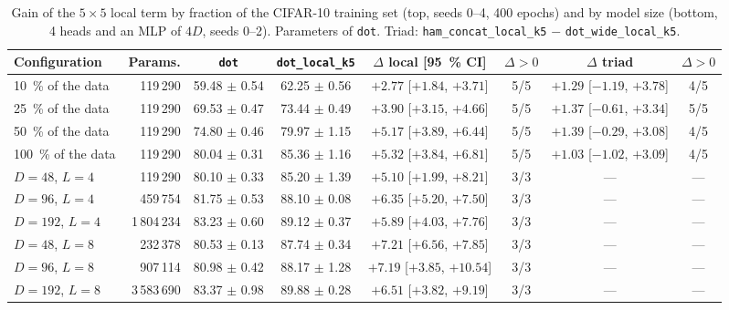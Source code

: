 
\begin{table}[!t]
\centering
\small
\caption{Gain of the $5\times5$ local term by fraction of the CIFAR-10 training set (top, seeds 0--4, 400 epochs) and by model size (bottom, 4 heads and an MLP of $4D$, seeds 0--2). Parameters of \texttt{dot}. Triad: \texttt{ham\_concat\_local\_k5} $-$ \texttt{dot\_wide\_local\_k5}.}
\label{tab:escala}
\begin{adjustbox}{max width=\linewidth}
\begin{tabular}{lrcccccc}
\toprule
Configuration & Params. & \texttt{dot} & \texttt{dot\_local\_k5} & $\Delta$ local [95~\% CI] & $\Delta>0$ & $\Delta$ triad & $\Delta>0$ \\
\midrule
10~\% of the data & 119\,290 & 59.48 $\pm$ 0.54 & 62.25 $\pm$ 0.56 & $+2.77$ [$+1.84$, $+3.71$] & 5/5 & $+1.29$ [$-1.19$, $+3.78$] & 4/5 \\
25~\% of the data & 119\,290 & 69.53 $\pm$ 0.47 & 73.44 $\pm$ 0.49 & $+3.90$ [$+3.15$, $+4.66$] & 5/5 & $+1.37$ [$-0.61$, $+3.34$] & 5/5 \\
50~\% of the data & 119\,290 & 74.80 $\pm$ 0.46 & 79.97 $\pm$ 1.15 & $+5.17$ [$+3.89$, $+6.44$] & 5/5 & $+1.39$ [$-0.29$, $+3.08$] & 4/5 \\
100~\% of the data & 119\,290 & 80.04 $\pm$ 0.31 & 85.36 $\pm$ 1.16 & $+5.32$ [$+3.84$, $+6.81$] & 5/5 & $+1.03$ [$-1.02$, $+3.09$] & 4/5 \\
\midrule
$D=48$, $L=4$ & 119\,290 & 80.10 $\pm$ 0.33 & 85.20 $\pm$ 1.39 & $+5.10$ [$+1.99$, $+8.21$] & 3/3 & --- & --- \\
$D=96$, $L=4$ & 459\,754 & 81.75 $\pm$ 0.53 & 88.10 $\pm$ 0.08 & $+6.35$ [$+5.20$, $+7.50$] & 3/3 & --- & --- \\
$D=192$, $L=4$ & 1\,804\,234 & 83.23 $\pm$ 0.60 & 89.12 $\pm$ 0.37 & $+5.89$ [$+4.03$, $+7.76$] & 3/3 & --- & --- \\
$D=48$, $L=8$ & 232\,378 & 80.53 $\pm$ 0.13 & 87.74 $\pm$ 0.34 & $+7.21$ [$+6.56$, $+7.85$] & 3/3 & --- & --- \\
$D=96$, $L=8$ & 907\,114 & 80.98 $\pm$ 0.42 & 88.17 $\pm$ 1.28 & $+7.19$ [$+3.85$, $+10.54$] & 3/3 & --- & --- \\
$D=192$, $L=8$ & 3\,583\,690 & 83.37 $\pm$ 0.98 & 89.88 $\pm$ 0.28 & $+6.51$ [$+3.82$, $+9.19$] & 3/3 & --- & --- \\
\bottomrule
\end{tabular}
\end{adjustbox}
\end{table}
